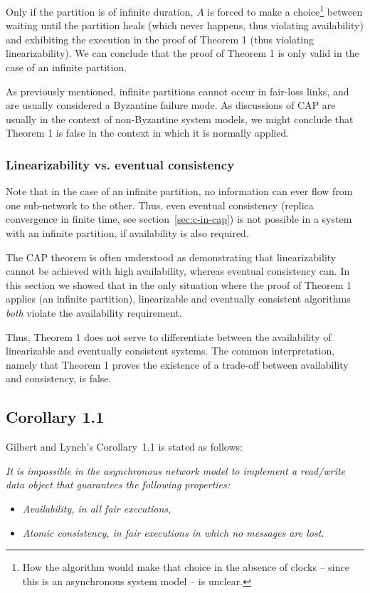 \documentclass[a4paper,twocolumn,10pt]{article}
\begin{document}
Only if the partition is of infinite duration, $A$ is forced to make a choice\footnote{How the
algorithm would make that choice in the absence of clocks -- since this is an asynchronous system
model -- is unclear.} between waiting until the partition heals (which never happens, thus violating
availability) and exhibiting the execution in the proof of Theorem 1 (thus violating
linearizability). We can conclude that the proof of Theorem 1 is only valid in the case of an
infinite partition.

As previously mentioned, infinite partitions cannot occur in fair-loss links, and are usually
considered a Byzantine failure mode. As discussions of CAP are usually in the context of
non-Byzantine system models, we might conclude that Theorem 1 is false in the context in which it is
normally applied.

\subsubsection{Linearizability vs. eventual consistency}

Note that in the case of an infinite partition, no information can ever flow from one sub-network to
the other. Thus, even eventual consistency (replica convergence in finite time, see
section~\ref{sec:c-in-cap}) is not possible in a system with an infinite partition, if availability
is also required.

The CAP theorem is often understood as demonstrating that linearizability cannot be achieved with
high availability, whereas eventual consistency can. In this section we showed that in the only
situation where the proof of Theorem 1 applies (an infinite partition), linearizable and eventually
consistent algorithms \emph{both} violate the availability requirement.

Thus, Theorem 1 does not serve to differentiate between the availability of linearizable and
eventually consistent systems. The common interpretation, namely that Theorem 1 proves the existence
of a trade-off between availability and consistency, is false.

\subsection{Corollary 1.1}\label{sec:corollary}

Gilbert and Lynch's Corollary~1.1 is stated as follows:

\emph{It is impossible in the asynchronous network model to implement a read/write data object that
guarantees the following properties:}
\begin{itemize}
\item \emph{Availability, in all fair executions,}
\item \emph{Atomic consistency, in fair executions in which \emph{no} messages are lost.}
\end{itemize}
\end{document}
